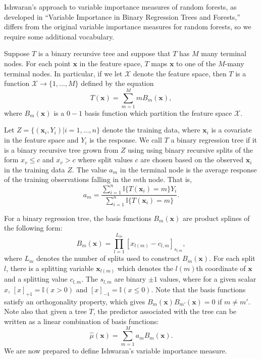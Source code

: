 \documentclass[12pt,twoside]{reedthesis}
\theoremstyle{definition}
\theoremstyle{definition}
\theoremstyle{definition}
\theoremstyle{remark}
\begin{document}
Ishwaran's approach to variable importance measures of random forests,
as developed in ``Variable Importance in Binary Regression Trees and
Forests,'' differs from the original variable importance measures for
random forests, so we require some additional vocabulary.

Suppose \(T\) is a binary recursive tree and suppose that \(T\) has
\(M\) many terminal nodes. For each point \(\mathbf{x}\) in the feature
space, \(T\) maps \(\mathbf{x}\) to one of the \(M\)-many terminal
nodes. In particular, if we let \(\mathcal{X}\) denote the feature
space, then \(T\) is a function
\(\mathcal{X}\rightarrow \{1,\ldots, M\}\) defined by the equation
\[T(\mathbf{x})=\sum_{m=1}^M m B_m(\mathbf{x}),\] where
\(B_m(\mathbf{x})\) is a \(0-1\) basis function which partition the
feature space \(\mathcal{X}\).

Let \(Z=\{(\mathbf{x}_i,Y_i)|i=1,\ldots,n\}\) denote the training data,
where \(\mathbf{x}_i\) is a covariate in the feature space and \(Y_i\)
is the response. We call \(T\) a binary regression tree if it is a
binary recursive tree grown from \(Z\) using using binary recursive
splits of the form \(x_v\leq c\) and \(x_v> c\) where split values \(c\)
are chosen based on the observed \(\mathbf{x}_i\) in the training data
\(Z\). The value \(a_m\) in the terminal node is the average response of
the training observations falling in the \(m\)th node. That is,
\[a_m=\frac{\sum_{i=1}^n \mathbb{I}\{T(\mathbf{x}_i)=m\} Y_i}{\sum_{i=1}^n \mathbb{I}\{T(\mathbf{x}_i)=m\}}.\]

For a binary regression tree, the basis functions \(B_m(\mathbf{x})\)
are product splines of the following form:
\[B_m(\mathbf{x})=\prod_{l = 1}^{L_m} [x_{l(m)}-c_{l, m}]_{s_{l,m}},\]
where \(L_m\) denotes the number of splits used to construct
\(B_m(\mathbf{x})\). For each split \(l\), there is a splitting variable
\(\mathbf{x}_{l(m)}\) which denotes the \(l(m)\)th coordinate of
\(\mathbf{x}\) and a splitting value \(c_{l,m}\). The \(s_{l,m}\) are
binary \(\pm 1\) values, where for a given scalar \(x\),
\([x]_{+1}=\mathbb{I}(x>0)\) and \([x]_{-1}=\mathbb{I}(x\leq 0).\) Note
that the basis functions satisfy an orthogonality property, which gives
\(B_m(\mathbf{x})B_{m'}(\mathbf{x})=0\) if \(m\neq m'\). Note also that
given a tree \(T\), the predictor associated with the tree can be
written as a linear combination of basis functions:
\[\hat{\mu}(\mathbf{x})=\sum_{m=1}^M a_m B_m(\mathbf{x}).\] We are now
prepared to define Ishwaran's variable importance measure.
\end{document}

